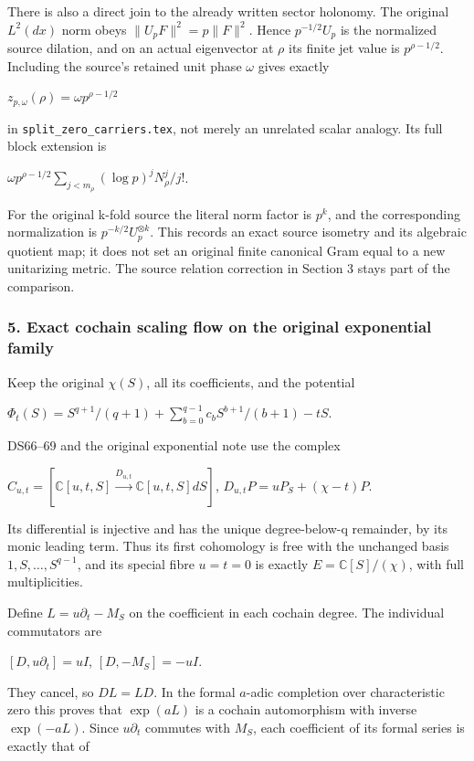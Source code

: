There is also a direct join to the already written sector holonomy. The original \(L^2(dx)\) norm obeys \(\lVert U_pF\rVert^2=p\lVert F\rVert^2\). Hence \(p^{-1/2}U_p\) is the normalized source dilation, and on an actual eigenvector at \(\rho\) its finite jet value is \(p^{\rho-1/2}\). Including the source's retained unit phase \(\omega\) gives exactly

\(z_{p,\omega}(\rho)=\omega p^{\rho-1/2}\)

in \nolinkurl{split_zero_carriers.tex}, not merely an unrelated scalar analogy. Its full block extension is

\(\omega p^{\rho-1/2} \sum_{j<m_\rho}(\log p)^j N_\rho^j/j!\).

For the original k-fold source the literal norm factor is \(p^k\), and the corresponding normalization is \(p^{-k/2}U_p^{\otimes k}\). This records an exact source isometry and its algebraic quotient map; it does not set an original finite canonical Gram equal to a new unitarizing metric. The source relation correction in Section 3 stays part of the comparison.

\subsubsection{5. Exact cochain scaling flow on the original exponential family}\label{endpoint-f1_scaling--exact-cochain-scaling-flow-on-the-original-exponential-family}

Keep the original \(\chi(S)\), all its coefficients, and the potential

\(\Phi_t(S)=S^{q+1}/(q+1)+\sum_{b=0}^{q-1} c_b S^{b+1}/(b+1)-tS\).

DS66--69 and the original exponential note use the complex

\(C_{u,t}=[\mathbb C[u,t,S]\xrightarrow{D_{u,t}}\mathbb C[u,t,S]dS]\), \(D_{u,t}P=u P_S+(\chi-t)P\).

Its differential is injective and has the unique degree-below-q remainder, by its monic leading term. Thus its first cohomology is free with the unchanged basis \(1,S,\ldots,S^{q-1}\), and its special fibre \(u=t=0\) is exactly \(E=\mathbb C[S]/(\chi)\), with full multiplicities.

Define \(L=u \partial_t-M_S\) on the coefficient in each cochain degree. The individual commutators are

\([D,u \partial_t]=u I\), \([D,-M_S]=-u I\).

They cancel, so \(D L=L D\). In the formal \(a\)-adic completion over characteristic zero this proves that \(\exp(aL)\) is a cochain automorphism with inverse \(\exp(-aL)\). Since \(u \partial_t\) commutes with \(M_S\), each coefficient of its formal series is exactly that of

